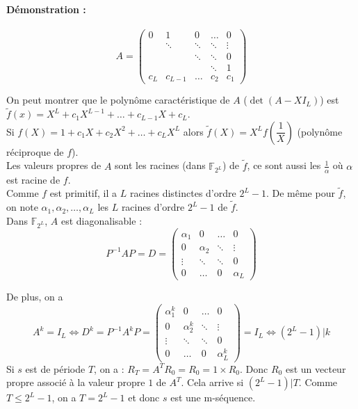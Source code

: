 \documentclass[12pt,a4paper]{report}
\begin{document}
\paragraph{Démonstration :\\}
$$A = \left( \begin{array}{ccccc}
0 & 1 & 0 & \ldots & 0 \\
 & \ddots & \ddots & \ddots & \vdots \\
 &        & \ddots & \ddots & 0 \\
 & & & \ddots & 1 \\
 c_L & c_{L-1} & \ldots & c_2 & c_1 \end{array} \right) $$
 
 On peut montrer que le polynôme caractéristique de $A$ ($\det(A-XI_L)$) est $\tilde{f}(x)= X^L + c_1X^{L-1} + \ldots + c_{L-1} X +c_L$.\\ Si $f(X) =  1+c_1X+c_2X^2+\ldots + c_LX^L$ alors $\tilde{f}(X) = X^Lf\left(\dfrac{1}{X}\right)$ (polynôme réciproque de $f$).\\
Les valeurs propres de $A$ sont les racines (dans $\mathbb{F}_{2^L}$) de $\tilde{f}$, ce sont aussi les $\frac{1}{\alpha}$ où $\alpha$ est racine de $f$.\\
Comme $f$ est primitif, il a $L$ racines distinctes d'ordre $2^L-1$. De même pour $\tilde{f}$, on note $\alpha_1, \alpha_2, \ldots, \alpha_L$ les $L$ racines d'ordre $2^L-1$ de $\tilde{f}$.\\
Dans $\mathbb{F}_{2^L}$, $A$ est diagonalisable :
$$ P^{-1}AP = D= \left( \begin{array}{cccc}
\alpha_1 & 0 &  \ldots & 0 \\
0 & \alpha_2 &\ddots  & \vdots \\
 \vdots & \ddots & \ddots & 0  \\
 0 & \ldots &  0 & \alpha_L 
\end{array} \right)$$

De plus, on a $$A^k=I_L \Leftrightarrow D^k= P^{-1}A^kP = \left( \begin{array}{cccc}
\alpha_1^k & 0 &  \ldots & 0 \\
0 & \alpha_2^k &\ddots  & \vdots \\
 \vdots & \ddots & \ddots & 0  \\
 0 & \ldots &  0 & \alpha_L^k
\end{array} \right)= I_L \Leftrightarrow (2^L-1) | k $$
Si $s$ est de période $T$, on a : $R_T = A^TR_0 = R_0 = 1 \times R_0$. Donc $R_0$ est un vecteur propre associé à la valeur propre $1$ de $A^T$. Cela arrive si $(2^L-1) | T$. Comme $T \leqslant 2^L-1$, on a $T=2^L-1$ et donc $s$ est une m-séquence.
\end{document}
